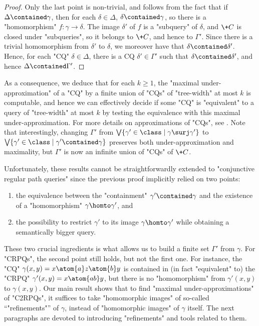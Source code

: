 \begin{proof}
Only the last point is non-trivial, and follows from the fact that if
$\Delta \contained \gamma$, then for each $\delta \in \Delta$, $\delta \contained \gamma$,
so there is a "homomorphism" $f\colon \gamma \to \delta$. The image $\delta'$
of $f$ is a "subquery" of $\delta$, and $\+C$ is closed under "subqueries",
so it belongs to $\+C$, and hence to $\Gamma'$. Since there is a trivial homomorphism
from $\delta'$ to $\delta$, we moreover have that $\delta \contained \delta'$.
Hence, for each "CQ" $\delta \in \Delta$, there is a CQ $\delta' \in \Gamma'$ such
that $\delta \contained \delta'$, and hence $\Delta \contained \Gamma'$.
\end{proof}

As a consequence, we deduce that for each $k \geq 1$,
the "maximal under-approximation" of a "CQ" by
a finite union of "CQs" of "tree-width" at most $k$ is computable, and hence
we can effectively decide if some "CQ" is "equivalent" to a query of "tree-width" at
most $k$ by testing the equivalence with this maximal under-approximation.
For more details on approximations of "CQs", see \cite{BarceloLibkinRomero2014Efficient}.
Note that interestingly, changing $\Gamma'$ from
$\bigvee \{ \gamma' \in \class \mid \gamma \surj \gamma' \}$
to $\bigvee \{ \gamma' \in \class \mid \gamma' \contained \gamma \}$
preserves both under-approximation and maximality, but $\Gamma'$ is now an infinite
union of "CQs" of $\+C$.

Unfortunately, these results cannot be straightforwardly extended to "conjunctive regular
path queries" since the previous proof implicitly relied on two points:
\begin{enumerate}
	\item the equivalence between the
	"containment" $\gamma' \contained \gamma$ and the existence of a "homomorphism"
	$\gamma \homto \gamma'$, and
	\item the possibility to restrict $\gamma'$ to its image $\gamma \homto \gamma'$ while 
	obtaining a semantically bigger query.
\end{enumerate}
These two crucial ingredients is what allows us to build a finite set $\Gamma'$ from $\gamma$.
For "CRPQs", the second point still holds, but not the first one.
For instance, the "CQ" $\gamma(x,y) = x \atom{a} z \atom{b} y$ is
contained in (in fact "equivalent" to) the "CRPQ" $\gamma'(x,y) = x \atom{ab} y$,
but there is no "homomorphism" from $\gamma'(x,y)$ to $\gamma(x,y)$.
Our main result shows that to find "maximal under-approximations" of "C2RPQs",
it suffices to take "homomorphic images" of so-called ``"refinements"'' of $\gamma$,
instead of "homomorphic images" of $\gamma$ itself. The next paragraphs are devoted to
introducing "refinements" and tools related to them.

